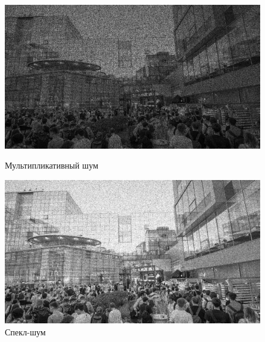 \documentclass[a4paper]{article}
\begin{document}
\begin{figure}[H]
    \begin{minipage}{0.49\textwidth}
        \centering \includegraphics[width=\textwidth]{images/1_noise/multiplicative.jpg}
        \caption{Мультипликативный шум}
    \end{minipage}\hfill
    \begin{minipage}{0.49\textwidth}
        \centering \includegraphics[width=\textwidth]{images/1_noise/speckle.jpg}
        \caption{Спекл-шум}
    \end{minipage}
\end{figure}
\end{document}
